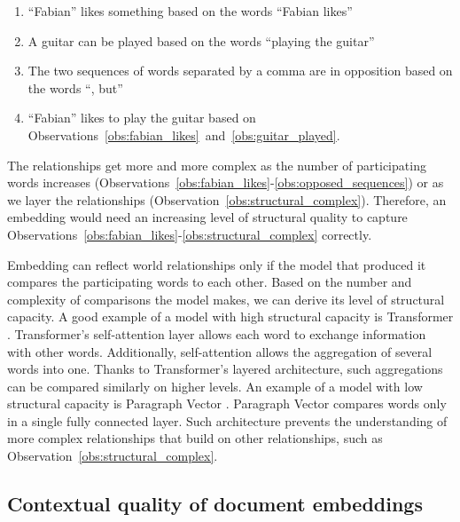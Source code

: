 \begin{enumerate}[label={Observation \arabic*.},ref=\arabic*,wide=0pt]

  \item ``Fabian'' likes something based on the words ``Fabian likes''
    \label{obs:fabian_likes}

  \item A guitar can be played based on the words ``playing the guitar''
    \label{obs:guitar_played}

  \item The two sequences of words separated by a comma are in opposition based
    on the words ``, but'' \label{obs:opposed_sequences}

  \item ``Fabian'' likes to play the guitar based on
    Observations~\ref{obs:fabian_likes}~and~\ref{obs:guitar_played}.
    \label{obs:structural_complex}

\end{enumerate}

The relationships get more and more complex as the number of participating
words increases
(Observations~\ref{obs:fabian_likes}-\ref{obs:opposed_sequences}) or as we
layer the relationships (Observation~\ref{obs:structural_complex}).
Therefore, an embedding would need an increasing level of structural quality to
capture Observations~\ref{obs:fabian_likes}-\ref{obs:structural_complex}
correctly.

Embedding can reflect world relationships only if the model that produced it
compares the participating words to each other. Based on the number and
complexity of comparisons the model makes, we can derive its level of
structural capacity. A good example of a model with high structural capacity is
Transformer \citep{vaswani2017attention}. Transformer's self-attention layer
allows each word to exchange information with other words. Additionally,
self-attention allows the aggregation of several words into one. Thanks to
Transformer's layered architecture, such aggregations can be compared similarly
on higher levels. An example of a model with low structural capacity is
Paragraph Vector \citep{le2014distributed}. Paragraph Vector compares words
only in a single fully connected layer. Such architecture prevents the
understanding of more complex relationships that build on other relationships,
such as Observation~\ref{obs:structural_complex}.

\subsection{Contextual quality of document embeddings}


